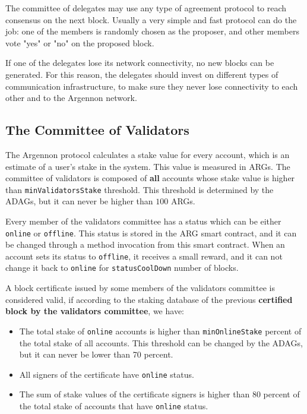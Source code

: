 The committee of delegates may use any type of agreement protocol to reach consensus on the
next block. Usually a very simple and fast protocol can do the job: one of the members
is randomly chosen as the proposer, and other members vote "yes" or "no" on the proposed block.

If one of the delegates lose its network connectivity, no new blocks can be generated. For this reason,
the delegates should invest on different types of communication infrastructure, to make sure they never lose
connectivity to each other and to the Argennon network.

\subsection{The Committee of Validators}\label{subsec:validators-committee}

The Argennon protocol calculates a stake value for every account, which is an estimate of a user's stake in the
system. This value is measured in ARGs. The committee of validators is composed of
\textbf{all} accounts whose stake value is higher than \texttt{minValidatorsStake} threshold. This
threshold is determined by the ADAGs, but it can never be higher
than $100$ ARGs.

Every member of the validators committee has a status which can be either \texttt{online} or \texttt{offline}.
This status is stored in the ARG smart contract, and it can be changed through a method invocation
from this smart contract. When an account sets its status to \texttt{offline}, it receives a small reward, and
it can not change it back to \texttt{online} for \texttt{statusCoolDown} number of blocks.


A block certificate issued by some members of the validators committee is considered valid, if according to
the staking database of the previous \textbf{certified block by the validators committee}, we have:
\begin{itemize}
    \item The total stake of \texttt{online} accounts is higher than \texttt{minOnlineStake} percent of the
    total stake of all accounts. This threshold can be changed by the ADAGs, but it can never be lower
    than 70 percent.
    \item All signers of the certificate have \texttt{online} status.
    \item The sum of stake values of the certificate signers is higher than 80 percent of the total stake
    of accounts that have \texttt{online} status.
\end{itemize}


